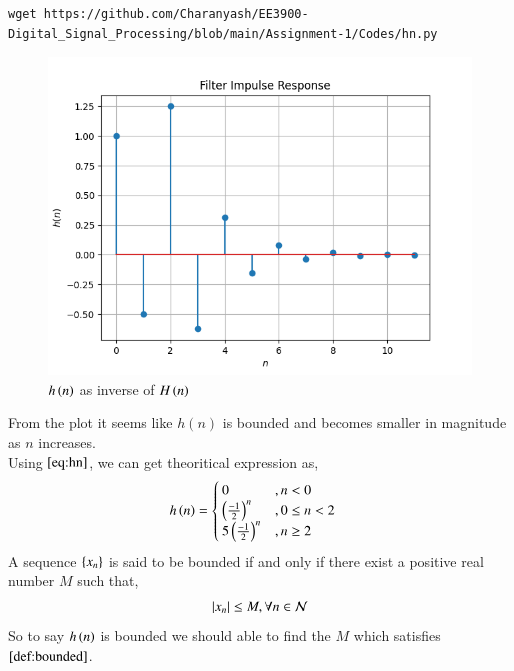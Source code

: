 \documentclass[journal,12pt,twocolumn]{IEEEtran}
\renewcommand\thesection{\arabic{section}}
\begin{document}
\begin{enumerate}[label=\thesection.\arabic*]
\begin{lstlisting}
wget https://github.com/Charanyash/EE3900-Digital_Signal_Processing/blob/main/Assignment-1/Codes/hn.py
\end{lstlisting}
           \begin{figure}[ht!]
                \centering
                \includegraphics[width = \columnwidth]{figs/hn.png}
                \caption{$h\left(n\right)$ as inverse of $H\left(n\right)$}
                \label{hn}
           \end{figure}
           From the plot it seems like $h(n)$ is bounded and becomes smaller in magnitude as $n$ increases.\\
           Using $\eqref{eq:hn}$, we can get theoritical expression as,
           \begin{align}
                h\left(n\right) & = \begin{cases}
                                   0                      & , n < 0     \\
                                   \left(\frac{-1}{2}\right)^n  & , 0\leq n<2 \\
                                   5\left(\frac{-1}{2}\right)^n & , n \geq 2
                              \end{cases}\label{eq:hn_theo}
           \end{align}
           A sequence $\left\{x_n\right\}$ is said to be bounded if and only if there exist a positive real number $M$ such that,
           \begin{align}
                \left\vert x_n\right\vert \leq M , \forall n \in \mathcal{N}\label{def:bounded}
           \end{align}
           So to say $h\left(n\right)$ is bounded we should able to find the $M$ which satisfies $\eqref{def:bounded}$.\\

\end{enumerate}
\end{document}
